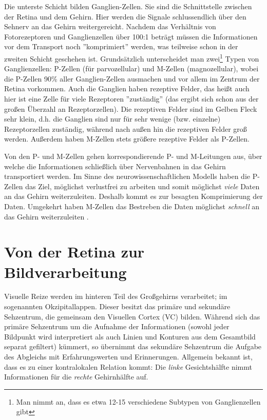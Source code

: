 \documentclass[12pt,a4paper]{article}
\newcommand{\Se}[1]{S. #1}
\begin{document}
Die unterste Schicht bilden Ganglien-Zellen. Sie sind die Schnittstelle
zwischen der Retina und dem Gehirn. Hier werden die Signale schlussendlich
über den Sehnerv an das Gehirn weitergereicht. Nachdem das Verhältnis von
Fotorezeptoren und Ganglienzellen über 100:1 beträgt
\cite[\Se{4}]{retinapathways} müssen die Informationen vor dem Transport noch
''komprimiert'' werden, was teilweise schon in der zweiten Schicht
geschehen ist. Grundsätzlich unterscheidet man zwei\footnote{Man nimmt an,
dass es etwa 12-15 verschiedene Subtypen von Ganglienzellen gibt} Typen von
Ganglienzellen: P-Zellen (für parvozellular) und M-Zellen (magnozellular),
\cite[\Se{4}, \Se{1}]{retinapathways} wobei die P-Zellen 90\% aller
Ganglien-Zellen ausmachen und vor allem im Zentrum der Retina vorkommen.
Auch die Ganglien haben rezeptive Felder, das heißt auch hier ist eine Zelle
für viele Rezeptoren ''zuständig'' (das ergibt sich schon aus der großen
Überzahl an Rezeptorzellen). Die rezeptiven Felder sind im Gelben Fleck sehr
klein, d.h. die Ganglien sind nur für sehr wenige (bzw. einzelne)
Rezeptorzellen zuständig, während nach außen hin die rezeptiven Felder groß
werden. Außerdem haben M-Zellen stets größere rezeptive Felder als P-Zellen.

Von den P- und M-Zellen gehen korrespondierende P- und M-Leitungen aus, über
welche die Informationen schließlich über Nervenbahnen in das Gehirn
transportiert werden. Im Sinne des neurowissenschaftlichen Modells haben
die P-Zellen das Ziel, möglichst verlustfrei zu arbeiten und somit möglichst
\emph{viele} Daten an das Gehirn weiterzuleiten. Deshalb kommt es zur
besagten Komprimierung der Daten. Umgekehrt haben M-Zellen das Bestreben
die Daten möglichst \emph{schnell} an das Gehirn weiterzuleiten \cite{vim}.

\section{Von der Retina zur Bildverarbeitung}
\label{sec:rebi}

Visuelle Reize werden im hinteren Teil des Großgehirns verarbeitet; im
sogenannten Okzipitallappen. Dieser besitzt das primäre und sekundäre
Sehzentrum, die gemeinsam den Visuellen Cortex (VC) bilden. Während
sich das primäre Sehzentrum um die Aufnahme der Informationen (sowohl
jeder Bildpunkt wird interpretiert als auch Linien und Konturen aus dem
Gesamtbild separat gefiltert) kümmert, so übernimmt das sekundäre Sehzentrum
die Aufgabe des Abgleichs mit Erfahrungswerten und Erinnerungen. Allgemein
bekannt ist, dass es zu einer kontralokalen Relation kommt: Die \emph{linke}
Gesichtshälfte nimmt Informationen für die \emph{rechte} Gehirnhälfte auf.
\end{document}
